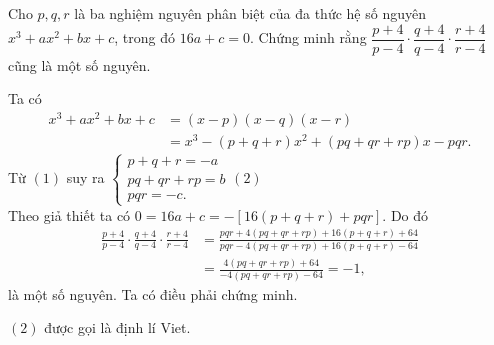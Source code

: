\begin{bt}%
Cho $p, q, r$ là ba nghiệm nguyên phân biệt của đa thức hệ số nguyên $x^3 + ax^2 + bx + c$, trong đó $16a+c=0$. Chứng minh rằng $\dfrac{p + 4}{p - 4} \cdot \dfrac{q + 4}{q - 4} \cdot \dfrac{r + 4}{r - 4}$ cũng là một số nguyên.
\loigiai
{Ta có
{\allowdisplaybreaks
\begin{align*}
x^3 + ax^2 + bx + c &= (x - p)(x - q)(x - r)\\
&= x^3 - (p + q + r)x^2 + (pq + qr + rp)x - pqr.\tag{1}
\end{align*}}Từ $(1)$ suy ra
$\left\{ \begin{array}{l}
p + q + r = - a\\
pq + qr + rp = b\\
pqr = - c.
\end{array} \right.$\hfill$(2)$\\
Theo giả thiết ta có $0 = 16a + c = - \left[ {16(p + q + r) + pqr} \right]$. Do đó
{\allowdisplaybreaks
\begin{align*}
\frac{p + 4}{p - 4} \cdot \frac{q + 4}{q - 4} \cdot \frac{r + 4}{r - 4} &= \frac{pqr + 4\left( pq + qr + rp \right) + 16\left( p + q + r \right) + 64}{pqr - 4\left( pq + qr + rp \right) + 16\left( p + q + r \right) - 64}\\
&= \frac{4\left( pq + qr + rp \right) + 64}{- 4\left(pq + qr + rp \right) - 64} = - 1,
\end{align*}}là một số nguyên. Ta có điều phải chứng minh.
\begin{nx}
$(2)$ được gọi là định lí Viet.
\end{nx}
}
\end{bt}
